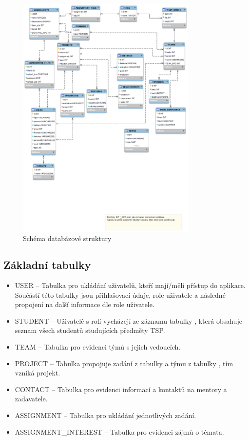 \documentclass[czech,BP]{thesiskiv}
\begin{document}
		\begin{figure}[H]
			\centering
			\includegraphics[width=0.8\textwidth]{img/database/database_model}
			\caption{Schéma databázové struktury}
		\end{figure}
		\subsection{Základní tabulky}
			\begin{itemize}
				\item USER -- Tabulka pro ukládání uživatelů, kteří mají/měli přístup do aplikace. Součástí této tabulky jsou přihlašovací údaje, role uživatele a následné propojení na další informace dle role uživatele.
				\item STUDENT -- Uživatelé s rolí  vycházejí ze záznamu tabulky , která obsahuje seznam všech studentů studujících předměty TSP.
				\item TEAM -- Tabulka pro evidenci týmů s jejich vedoucích.
				\item PROJECT -- Tabulka propojuje zadání z tabulky  a týmu z tabulky , tím vzniká projekt.
				\item CONTACT -- Tabulka pro evidenci informací a kontaktů na mentory a zadavatele.
				\item ASSIGNMENT -- Tabulka pro ukládání jednotlivých zadání.
				\item ASSIGNMENT\_INTEREST -- Tabulka pro evidenci zájmů o témata.
			\end{itemize}
\end{document}

